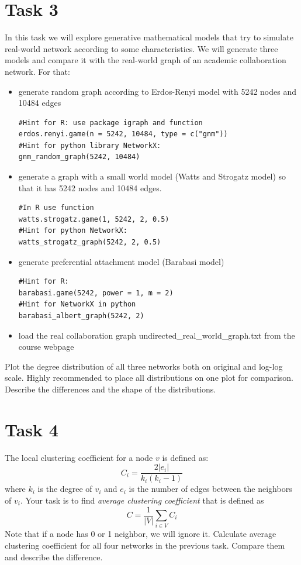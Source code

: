 \documentclass{article}
\begin{document}
\section*{Task 3}
In this task we will explore generative mathematical models that try to simulate real-world network according to some characteristics. We will generate three models and compare it with the real-world graph of an academic collaboration network. For that:
\begin{itemize}
\item generate random graph according to Erdos-Renyi model with 5242 nodes and 10484 edges 
\begin{lstlisting}
#Hint for R: use package igraph and function 
erdos.renyi.game(n = 5242, 10484, type = c("gnm"))
#Hint for python library NetworkX: 
gnm_random_graph(5242, 10484)
\end{lstlisting}
\item generate a graph with a small world model (Watts and Strogatz model) so that it has 5242 nodes and 10484 edges. 
\begin{lstlisting}
#In R use function
watts.strogatz.game(1, 5242, 2, 0.5)
#Hint for python NetworkX: 
watts_strogatz_graph(5242, 2, 0.5)
\end{lstlisting}
\item generate preferential attachment model (Barabasi model)
\begin{lstlisting}
#Hint for R: 
barabasi.game(5242, power = 1, m = 2)
#Hint for NetworkX in python 
barabasi_albert_graph(5242, 2)
\end{lstlisting}
\item  load the real collaboration graph undirected\_real\_world\_graph.txt from the course webpage
\end{itemize}
Plot the degree distribution of all three networks both on original and log-log scale. Highly recommended to place all distributions on one plot for comparison. Describe the differences and the shape of the distributions.
 
\section*{Task 4}
The local clustering coefficient for a node $v$ is defined as:
$$C_i = \frac{2|e_i|}{k_i(k_i-1)}$$
where $k_i$ is the degree of $v_i$ and $e_i$ is the number of edges between the neighbors of $v_i$. Your task is to find \emph{average clustering coefficient} that is defined as 
$$C = \frac{1}{|V|}\sum_{i\in V}C_i$$
Note that if a node has 0 or 1 neighbor, we will ignore it.
Calculate average clustering coefficient for all four networks in the previous task. Compare them and describe the difference. 
\end{document}
